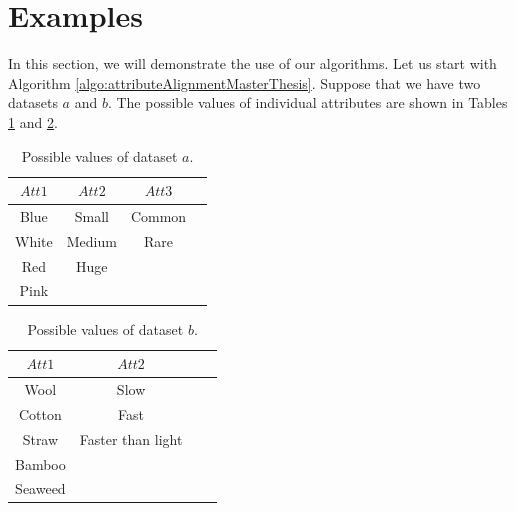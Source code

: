 \section {Examples}
In this section, we will demonstrate the use of our algorithms.
Let us start with Algorithm \ref{algo:attributeAlignmentMasterThesis}. Suppose that we have two datasets $a$ and $b$. The possible values of individual attributes are shown in Tables \ref{table:dataseta} and \ref{table:datasetb}.
\begin{table}[htbp]
\caption{Possible values of dataset $a$.}
\label{table:dataseta}
\centering
\begin{tabular}{ |c | c | c |c | }
  \hline
  $Att1$ & $Att2$ & $Att3$ \\
  \hline                       
  Blue & Small & Common \\
  White & Medium & Rare \\
  Red & Huge &  \\
  Pink &  &  \\
  \hline  
\end{tabular}
\end{table}

\begin{table}[htbp]
\caption{Possible values of dataset $b$.}
\label{table:datasetb}
\centering
\begin{tabular}{ |c | c | c |c | }
  \hline
  $Att1$ & $Att2$  \\
  \hline                       
  Wool &  Slow \\
  Cotton &  Fast \\
  Straw &  Faster than light \\
  Bamboo &    \\
  Seaweed &    \\
  \hline  
\end{tabular}
\end{table}

